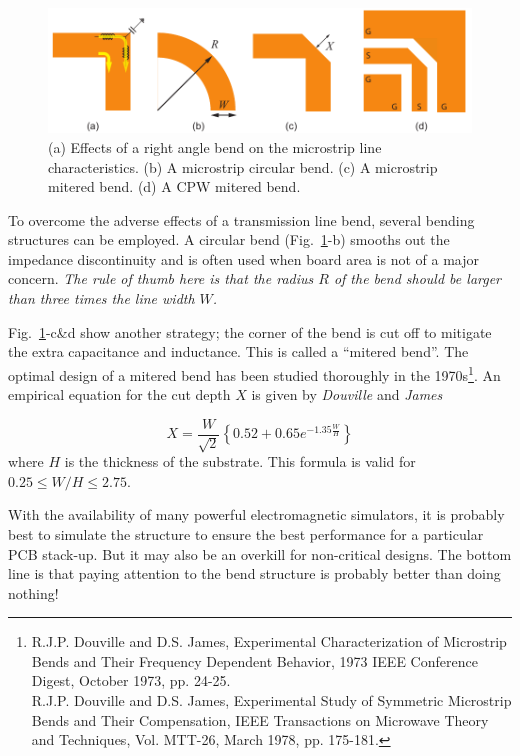 \documentclass[12pt,letterpaper]{scrartcl}
\begin{document}
	\begin{figure}[hp]
		\centering
		\includegraphics{bends}
		\caption{(a) Effects of a right angle bend on the microstrip line characteristics. (b) A microstrip circular bend. (c) A microstrip mitered bend. (d) A CPW mitered bend.}
		\label{fig:bends}
	\end{figure}

To overcome the adverse effects of a transmission line bend, several bending structures can be employed. A circular bend (Fig.~\ref{fig:bends}-b) smooths out the impedance discontinuity and is often used when board area is not of a major concern. \textit{The rule of thumb here is that the radius $R$ of the bend should be larger than three times the line width $W$.}

Fig.~\ref{fig:bends}-c\&d show another strategy; the corner of the bend is cut off to mitigate the extra capacitance and inductance. This is called a ``mitered bend''. The optimal design of a mitered bend has been studied thoroughly in the 1970s\footnote{R.J.P. Douville and D.S. James, Experimental Characterization of Microstrip Bends and Their Frequency Dependent Behavior, 1973 IEEE Conference Digest, October 1973, pp. 24-25. \\
R.J.P. Douville and D.S. James, Experimental Study of Symmetric Microstrip Bends and Their Compensation, IEEE Transactions on Microwave Theory and Techniques, Vol. MTT-26, March 1978, pp. 175-181.}. An empirical equation for the cut depth $X$ is given by \textit{Douville} and \textit{James}

\[
X = \frac{W}{\sqrt{2}} \left\{0.52 + 0.65e^{ -1.35\frac{W}{ H}}    \right\}
\]
where $H$ is the thickness of the substrate. This formula is valid for $0.25\leq W/H \leq 2.75$. 

With the availability of many powerful electromagnetic simulators, it is probably best to simulate the structure to ensure the best performance for a particular PCB stack-up. But it may also be an overkill for non-critical designs. The bottom line is that paying attention to the bend structure is probably better than doing nothing!
\end{document}
